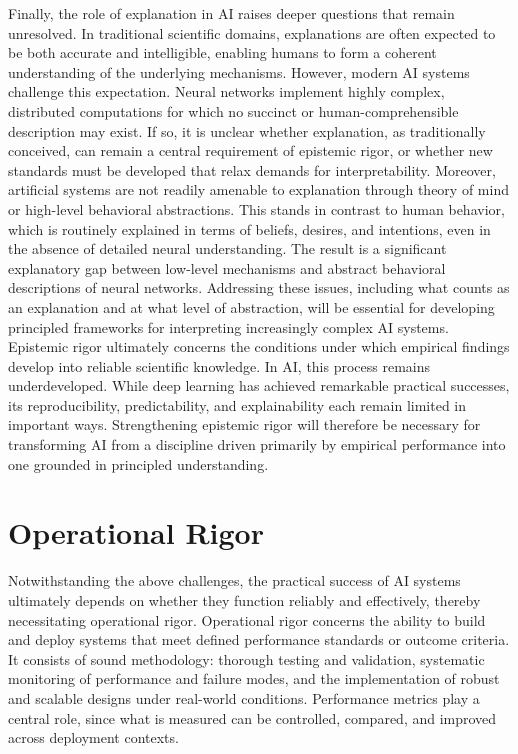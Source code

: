 \documentclass{article}
\begin{document}
Finally, the role of explanation in AI raises deeper questions that remain unresolved.
In traditional scientific domains, explanations are often expected to be both accurate and intelligible, enabling humans to form a coherent understanding of the underlying mechanisms.
However, modern AI systems challenge this expectation.
Neural networks implement highly complex, distributed computations for which no succinct or human-comprehensible description may exist.
If so, it is unclear whether explanation, as traditionally conceived, can remain a central requirement of epistemic rigor, or whether new standards must be developed that relax demands for interpretability.
Moreover, artificial systems are not readily amenable to explanation through theory of mind or high-level behavioral abstractions.
This stands in contrast to human behavior, which is routinely explained in terms of beliefs, desires, and intentions, even in the absence of detailed neural understanding.
The result is a significant explanatory gap between low-level mechanisms and abstract behavioral descriptions of neural networks.
Addressing these issues, including what counts as an explanation and at what level of abstraction, will be essential for developing principled frameworks for interpreting increasingly complex AI systems.\\

Epistemic rigor ultimately concerns the conditions under which empirical findings develop into reliable scientific knowledge.
In AI, this process remains underdeveloped.
While deep learning has achieved remarkable practical successes, its reproducibility, predictability, and explainability each remain limited in important ways.
Strengthening epistemic rigor will therefore be necessary for transforming AI from a discipline driven primarily by empirical performance into one grounded in principled understanding.


\section{Operational Rigor}
\label{sec:OperationalRigor}

Notwithstanding the above challenges, the practical success of AI systems ultimately depends on whether they function reliably and effectively, thereby necessitating operational rigor.
Operational rigor concerns the ability to build and deploy systems that meet defined performance standards or outcome criteria.
It consists of sound methodology: thorough testing and validation, systematic monitoring of performance and failure modes, and the implementation of robust and scalable designs under real-world conditions.
Performance metrics play a central role, since what is measured can be controlled, compared, and improved across deployment contexts.
\end{document}
